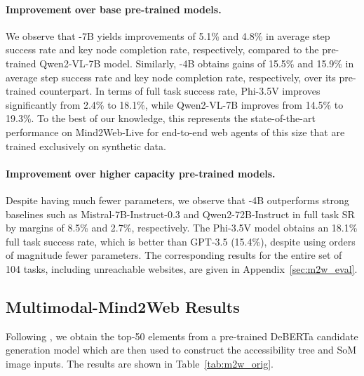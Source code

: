 \paragraph{Improvement over base pre-trained models.}
We observe that \model-7B yields improvements of 5.1\% and 4.8\% in average step success rate and key node completion rate, respectively, compared to the pre-trained Qwen2-VL-7B model. 
Similarly, \model-4B obtains gains of 15.5\% and 15.9\% in average step success rate and key node completion rate, respectively, over its pre-trained counterpart.
In terms of full task success rate, Phi-3.5V improves significantly from 2.4\% to 18.1\%, while Qwen2-VL-7B improves from 14.5\% to 19.3\%. 
To the best of our knowledge, this represents the state-of-the-art performance on Mind2Web-Live for end-to-end web agents of this size that are trained exclusively on synthetic data.
\\



\paragraph{Improvement over higher capacity pre-trained models.}
Despite having much fewer parameters, we observe that \model-4B outperforms strong baselines such as Mistral-7B-Instruct-0.3 and Qwen2-72B-Instruct in full task SR by margins of 8.5\% and 2.7\%, respectively.
The Phi-3.5V model obtains an 18.1\% full task success rate, which is better than GPT-3.5 (15.4\%), despite using orders of magnitude fewer parameters.
The corresponding results for the entire set of 104 tasks, including unreachable websites, are given in Appendix~\ref{sec:m2w_eval}.


\subsection{Multimodal-Mind2Web Results} \label{sec:mm_m2w_results}
Following \citet{mind2web}, we obtain the top-50 elements from a pre-trained DeBERTa \cite{he2021deberta} candidate generation model which are then used to construct the accessibility tree and SoM image inputs.
The results are shown in Table~\ref{tab:m2w_orig}.

